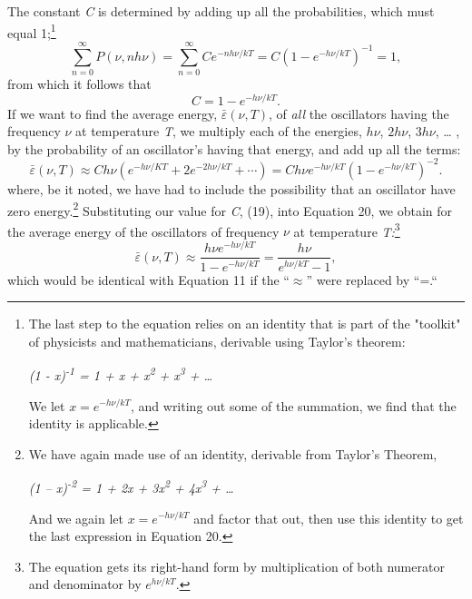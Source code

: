 The constant \emph{C} is determined by adding up all the probabilities, 
which must equal 1;\footnote{The last step to the equation relies on an
  identity that is part of the "toolkit" of physicists and
  mathematicians, derivable using Taylor's theorem:

  \emph{(1 - x)\textsuperscript{-1} = 1 + x + x\textsuperscript{2} +
  x\textsuperscript{3} + \ldots{}}

  We let $x = e^{-h\nu/kT}$, and writing out
  some of the summation, we find that the identity is applicable.}
%
\begin{equation}
\sum_{n=0}^{\infty} P(\nu, nh\nu) = \sum_{n=0}^{\infty} Ce^{-nh\nu/kT} = C(1 - e^{-h\nu/kT})^{-1} = 1, %
\end{equation}
%
from which it follows that
\begin{equation}
C = 1 - e^{-h\nu/kT}. %
\end{equation}
If we want to find the average energy, $\bar{\varepsilon}(\nu, T)$, of \emph{all} the
oscillators having the frequency $\nu$ at temperature \emph{T}, we
multiply each of the energies, $h\nu$, $2h\nu$, $3h\nu$, \ldots
, by the probability of an oscillator's having that energy, and add up
all the terms:
%
\begin{equation}
\bar{\varepsilon}(\nu, T) \approx Ch\nu\left(e^{-h\nu/KT}+2e^{-2h\nu/kT}+\cdots\right) = Ch\nu e^{-h\nu/kT}\left(1-e^{-h\nu/kT}\right)^{-2}. %
\end{equation}
%
where, be it noted, we have had to include the possibility that an
oscillator have zero energy.\footnote{We have again made use of an
  identity, derivable from Taylor's Theorem,

  \emph{(1 -- x)\textsuperscript{-2} = 1 + 2x + 3x\textsuperscript{2} +
  4x\textsuperscript{3} + \ldots{} }

  And we again let $x = e^{-h\nu/kT}$ and
  factor that out, then use this identity to get the last expression in
  Equation 20.} Substituting our value for \emph{C}, (19), into Equation
20, we obtain for the average energy of the oscillators of frequency
$\nu$ at temperature \emph{T:}\footnote{The equation gets its
  right-hand form by multiplication of both numerator and denominator by
  $e^{h\nu/kT}$.}
%
\begin{equation}
\bar{\varepsilon}(\nu, T) \approx \frac{h\nu e^{-h\nu/kT}}{1-e^{-h\nu/kT}} = \frac{h\nu}{e^{h\nu/kT}-1}, %
\end{equation}
%
which would be identical with Equation 11 if the ``$\approx$'' were replaced
by ``=.``


